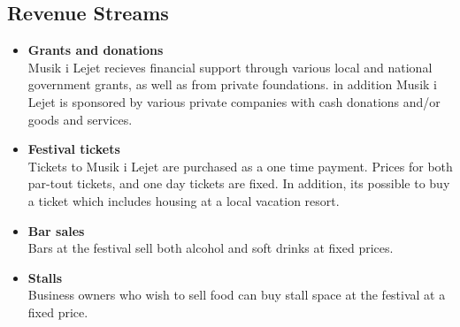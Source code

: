 \subsection{Revenue Streams} %
\label{sub:revenue_streams}
\begin{itemize}
(møde med andreas)
	\item \textbf{Grants and donations}\\
	Musik i Lejet recieves financial support through various local and national government grants, as well as from private foundations. in addition Musik i Lejet is sponsored by various private companies with cash donations and/or goods and services.
	\item \textbf{Festival tickets}\\
	Tickets to Musik i Lejet are purchased as a one time payment. Prices for both par-tout tickets, and one day tickets are fixed. In addition, its possible to buy a ticket which includes housing at a local vacation resort.
	\item \textbf{Bar sales}\\
	Bars at the festival sell both alcohol and soft drinks at fixed prices.
	\item \textbf{Stalls}\\
	Business owners who wish to sell food can buy stall space at the festival at a fixed price.
\end{itemize}

